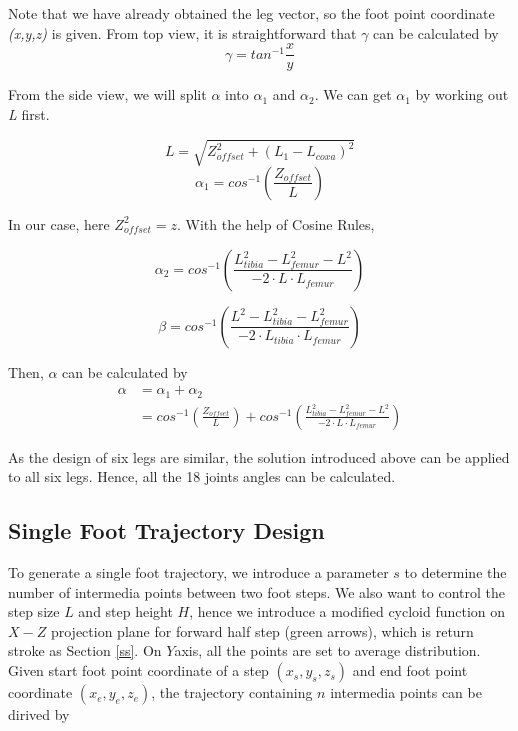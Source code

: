 \documentclass[conference]{IEEEtran}
\begin{document}
Note that we have already obtained the leg vector, so the foot point coordinate \textit{(x,y,z)} is given. From top view, it is straightforward that \(\gamma\) can be calculated by 
\begin{equation}
    \gamma = tan^{-1} \frac{x}{y}
\end{equation}

From the side view, we will split \(\alpha\) into \(\alpha_1\) and \(\alpha_2\). We can get \(\alpha_1\) by working out \textit{L} first.

\begin{equation}
    L=\sqrt{Z^{2}_{offset} + (L_1 - L_{coxa})^2}
\end{equation}
\begin{equation}
    \alpha_1 = cos^{-1}(\frac{Z_{offset}}{L})
\end{equation}

In our case, here \(Z^{2}_{offset}=z\). With the help of Cosine Rules,

\begin{equation}
    \alpha_2 = cos^{-1}(\frac{L_{tibia}^2-L_{femur}^2 - L^2}{-2\cdot L \cdot L_{femur}})
\end{equation}

\begin{equation}
    \beta = cos^{-1}(\frac{ L^2-L_{tibia}^2-L_{femur}^2}{-2\cdot L_{tibia} \cdot L_{femur}})
\end{equation}

Then, \(\alpha\) can be calculated by 
\begin{equation}
    \begin{aligned}
        \alpha &= \alpha_1 + \alpha_2\\
        &= cos^{-1}(\frac{Z_{offset}}{L})+cos^{-1}(\frac{L_{tibia}^2-L_{femur}^2 - L^2}{-2\cdot L \cdot L_{femur}})
    \end{aligned}
\end{equation}

As the design of six legs are similar, the solution introduced above can be applied to all six legs. Hence, all the 18 joints angles can be calculated.

\subsection{Single Foot Trajectory Design}

To generate a single foot trajectory, we introduce a parameter \(s\) to determine the number of intermedia points between two foot steps. We also want to control the step size \(L\) and step height \(H\), hence we introduce a modified cycloid function on \(X-Z\) projection plane for forward half step (green arrows), which is return stroke as Section \ref{ss}. On \(Y\)axis, all the points are set to average distribution. Given start foot point coordinate of a step \((x_s, y_s, z_s)\) and end foot point coordinate \((x_e, y_e, z_e)\), the trajectory containing \(n\) intermedia points can be dirived by 
\end{document}
